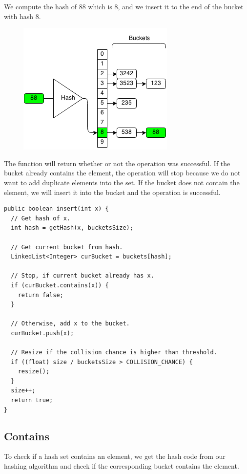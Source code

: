 \documentclass[11pt,oneside]{book}
\makeatletter
\def\maxwidth#1{\ifdim\Gin@nat@width>#1 #1\else\Gin@nat@width\fi}
\makeatother
\begin{document}
We compute the hash of 88 which is 8, and we insert it to the end of the bucket with hash 8.

\vspace{5px}\begin{figure}[H]\centering
        \includegraphics[width=0.66\maxwidth{\textwidth}]{hashsetinsert.png}
        \end{figure}

The function will return whether or not the operation was successful. If the bucket already contains the element, the operation will stop because we do not want to add duplicate elements into the set. If the bucket does not contain the element, we will insert it into the bucket and the operation is successful.

\begin{lstlisting}
public boolean insert(int x) {
  // Get hash of x.
  int hash = getHash(x, bucketsSize);

  // Get current bucket from hash.
  LinkedList<Integer> curBucket = buckets[hash];
  
  // Stop, if current bucket already has x.
  if (curBucket.contains(x)) {
    return false;
  }
  
  // Otherwise, add x to the bucket.
  curBucket.push(x);
  
  // Resize if the collision chance is higher than threshold.
  if ((float) size / bucketsSize > COLLISION_CHANCE) {
    resize();
  }
  size++;
  return true;
}
\end{lstlisting}

\subsection{Contains}

To check if a hash set contains an element, we get the hash code from our hashing algorithm and check if the corresponding bucket contains the element.
\end{document}
